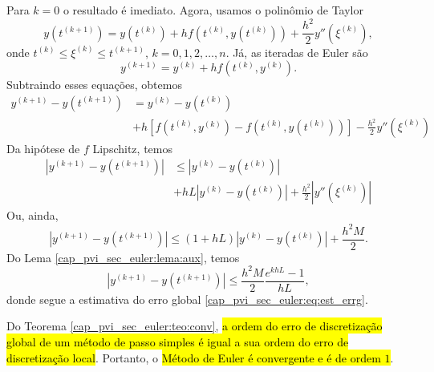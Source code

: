 \begin{dem}
  Para $k=0$ o resultado é imediato. Agora, usamos o polinômio de Taylor
  \begin{equation}
    y\left(t^{(k+1)}\right) = y\left(t^{(k)}\right) + hf\left(t^{(k)}, y\left(t^{(k)}\right)\right) + \frac{h^2}{2}y''\left(\xi^{(k)}\right),
  \end{equation}
  onde $t^{(k)} \leq \xi^{(k)} \leq t^{(k+1)}$, $k=0, 1, 2, \ldots, n$. Já, as iteradas de Euler são
  \begin{equation}
    y^{(k+1)} = y^{(k)} + hf\left(t^{(k)}, y^{(k)}\right).
  \end{equation}
  Subtraindo esses equações, obtemos
  \begin{equation}
    \begin{aligned}
      y^{(k+1)} - y\left(t^{(k+1)}\right) &= y^{(k)} - y\left(t^{(k)}\right) \\
      &+ h\left[f\left(t^{(k)}, y^{(k)}\right) - f\left(t^{(k)}, y\left(t^{(k)}\right)\right)\right] - \frac{h^2}{2}y''\left(\xi^{(k)}\right)
    \end{aligned}
  \end{equation}
  Da hipótese de $f$ Lipschitz, temos
  \begin{equation}
    \begin{aligned}
      \left|y^{(k+1)} - y\left(t^{(k+1)}\right)\right| &\leq \left|y^{(k)} - y\left(t^{(k)}\right)\right| \\
      &+ hL\left|y^{(k)} - y\left(t^{(k)}\right)\right| + \frac{h^2}{2}\left|y''\left(\xi^{(k)}\right)\right|
    \end{aligned}
  \end{equation}
  Ou, ainda,
  \begin{equation}
    \left|y^{(k+1)} - y\left(t^{(k+1)}\right)\right| \leq (1 + hL)\left|y^{(k)} - y\left(t^{(k)}\right)\right| + \frac{h^2M}{2}.
  \end{equation}
  Do Lema \ref{cap_pvi_sec_euler:lema:aux}, temos
  \begin{equation}
    \left|y^{(k+1)} - y\left(t^{(k+1)}\right)\right| \leq \frac{h^2M}{2}\frac{e^{khL}-1}{hL},
  \end{equation}
  donde segue a estimativa do erro global \eqref{cap_pvi_sec_euler:eq:est_errg}.
\end{dem}

\begin{obs}
  Do Teorema \ref{cap_pvi_sec_euler:teo:conv}, \hl{a ordem do erro de discretização global de um método de passo simples é igual a sua ordem do erro de discretização local}. Portanto, o \hl{Método de Euler é convergente e é de ordem $1$}.
\end{obs}

